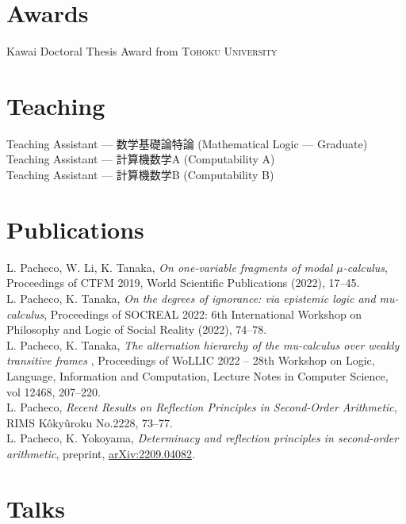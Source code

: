 \documentclass[11pt, a4paper]{article}
\newcommand{\years}[1]{\marginnote{\scriptsize #1}}
\begin{document}
\section*{Awards}
\years{2023} Kawai Doctoral Thesis Award from \textsc{Tohoku University}


\newpage

\section*{Teaching}
\years{2021} Teaching Assistant --- 数学基礎論特論 (Mathematical Logic --- Graduate)\\
\years{2021} Teaching Assistant --- 計算機数学A  (Computability A)\\
\years{2022} Teaching Assistant --- 計算機数学B  (Computability B)\\


\section*{Publications}
\noindent L. Pacheco, W. Li, K. Tanaka, \emph{On one-variable fragments of modal $\mu$-calculus}, Proceedings of CTFM 2019, World Scientific Publications (2022), 17--45. \\

L. Pacheco, K. Tanaka, \emph{On the degrees of ignorance: via epistemic logic and mu-calculus}, Proceedings of SOCREAL 2022: 6th International Workshop on Philosophy and Logic of Social Reality (2022), 74–78. \\

L. Pacheco, K. Tanaka, \emph{The alternation hierarchy of the mu-calculus over weakly transitive frames} , Proceedings of WoLLIC 2022 – 28th Workshop on Logic, Language, Information and Computation, Lecture Notes in Computer Science, vol 12468, 207--220. \\

L. Pacheco, \emph{Recent Results on Reflection Principles in Second-Order Arithmetic}, RIMS Kôkyûroku No.2228, 73--77. \\

L. Pacheco, K. Yokoyama, \emph{Determinacy and reflection principles in second-order arithmetic}, preprint, \href{https://arxiv.org/abs/2209.04082}{arXiv:2209.04082}.

\section*{Talks}
\end{document}
